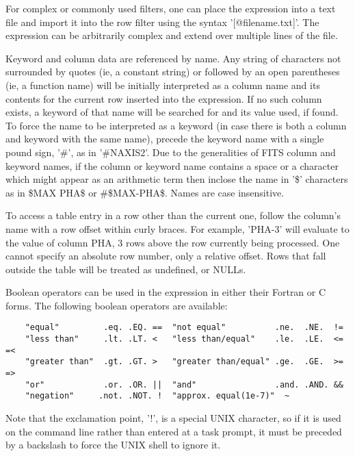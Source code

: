 \documentclass[11pt]{book}
\begin{document}
    For complex or commonly  used filters, one can place the expression
    into a text file and import it into the row filter using the syntax
    '[@filename.txt]'.  The expression can be  arbitrarily complex and
    extend over multiple lines of the file.

    Keyword and   column data  are referenced by   name.  Any  string of
    characters not surrounded by    quotes (ie, a constant  string)   or
    followed by   an open parentheses (ie,   a  function name)   will be
    initially interpreted   as a column  name and  its contents for the
    current row inserted into the expression.  If no such column exists,
    a keyword of that  name will be searched for  and its value used, if
    found.  To force the  name to be  interpreted as a keyword (in case
    there is both a column and keyword with the  same name), precede the
    keyword name with a single pound sign, '\#', as in '\#NAXIS2'.  Due to
    the generalities of FITS column and  keyword names, if the column or
    keyword name  contains a space or a  character which might appear as
    an arithmetic  term then inclose  the  name in '\$'  characters as in
    \$MAX PHA\$ or \#\$MAX-PHA\$.  Names are case insensitive.

    To access a table entry in a row other  than the current one, follow
    the  column's name  with  a row  offset  within  curly  braces.  For
    example, 'PHA{-3}' will evaluate to the value  of column PHA, 3 rows
    above  the  row currently  being processed.   One  cannot specify an
    absolute row number, only a relative offset.  Rows that fall outside
    the table will be treated as undefined, or NULLs.

    Boolean   operators can be  used in  the expression  in either their
    Fortran or C forms.  The following boolean operators are available:

\begin{verbatim}
    "equal"         .eq. .EQ. ==  "not equal"          .ne.  .NE.  !=
    "less than"     .lt. .LT. <   "less than/equal"    .le.  .LE.  <= =<
    "greater than"  .gt. .GT. >   "greater than/equal" .ge.  .GE.  >= =>
    "or"            .or. .OR. ||  "and"                .and. .AND. &&
    "negation"     .not. .NOT. !  "approx. equal(1e-7)"  ~
\end{verbatim}

Note  that the exclamation
point,  '!', is a special UNIX character, so if it is used  on the
command line rather than entered at a task prompt, it must be  preceded
by a backslash to force the UNIX shell to ignore it.
\end{document}
